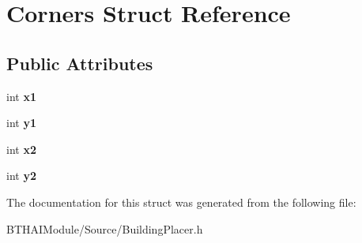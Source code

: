 \hypertarget{struct_corners}{\section{Corners Struct Reference}
\label{struct_corners}
}
\subsection*{Public Attributes}
\begin{DoxyCompactItemize}
\item 
\hypertarget{struct_corners_ac31e2f5560f25c376e427a7e5dd2547c}{int {\bfseries x1}}\label{struct_corners_ac31e2f5560f25c376e427a7e5dd2547c}

\item 
\hypertarget{struct_corners_ab0ad7d4ac3b1465ac994202aeb0cee13}{int {\bfseries y1}}\label{struct_corners_ab0ad7d4ac3b1465ac994202aeb0cee13}

\item 
\hypertarget{struct_corners_ae9f5f37bed49f966b35dcbad677b5820}{int {\bfseries x2}}\label{struct_corners_ae9f5f37bed49f966b35dcbad677b5820}

\item 
\hypertarget{struct_corners_a56dcb1da543b559236529fa7f4d22d6a}{int {\bfseries y2}}\label{struct_corners_a56dcb1da543b559236529fa7f4d22d6a}

\end{DoxyCompactItemize}


The documentation for this struct was generated from the following file\-:\begin{DoxyCompactItemize}
\item 
B\-T\-H\-A\-I\-Module/\-Source/Building\-Placer.\-h\end{DoxyCompactItemize}
